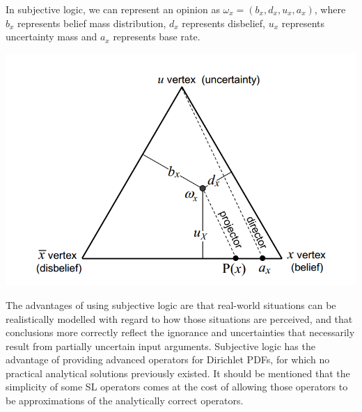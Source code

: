 \documentclass[UTF8]{article}
\newcommand{\opinion}[5]{$\omega_{#1} = (#2, #3, #4, #5)$}
\begin{document}
In subjective logic, we can represent an opinion as \opinion{x}{b_x}{d_x}{u_x}{a_x}, where $b_x$ represents belief mass distribution, $d_x$ represents disbelief, $u_x$ represents uncertainty mass and $a_x$ represents base rate. 
\begin{center}
    \includegraphics[width=6in]{images/barycentric.png}
\end{center}
The advantages of using subjective logic are that real-world situations can be
realistically modelled with regard to how those situations are perceived, and that conclusions more correctly reflect the ignorance and uncertainties that necessarily result from partially uncertain input arguments. Subjective logic has the advantage of providing advanced operators for Dirichlet PDFs, for which no practical analytical solutions previously existed. It should be mentioned that the simplicity of some SL operators comes at the cost of allowing those operators to be approximations of the analytically correct operators. 
\end{document}
